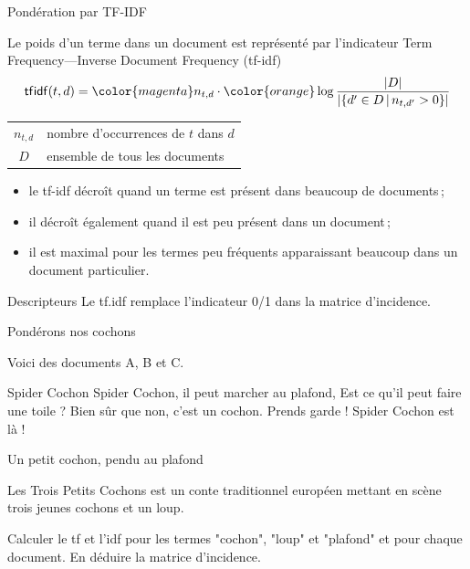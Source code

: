 \begin{frame}{Pondération par TF-IDF}

Le poids d'un terme dans un document est représenté par l'indicateur  \alert{Term Frequency---Inverse Document Frequency} (tf-idf)
 \[
\mathop{\mathsf{tf{}idf}}(t,d)={\color{magenta}n_{t,d}}\cdot
\color{orange}\log\frac{|D|}{\left|\left\{d'\in D\,|\,n_{t,d'}>0\right\}\right|}\]
\begin{center}\begin{tabular}{cl}
$n_{t,d}$& nombre d'occurrences de $t$ dans $d$\\
$D$& ensemble de tous les documents
\end{tabular}
\end{center}

\begin{itemize}
  \item le tf-idf décroît quand un terme est présent dans beaucoup de documents\,;
  \item il décroît également quand il est peu présent dans un document\,;
  \item il est maximal pour les termes peu fréquents apparaissant beaucoup dans un document particulier.
\end{itemize}

\begin{block}{Descripteurs}
Le tf.idf remplace l'indicateur 0/1 dans la matrice d'incidence.
\end{block}
\end{frame}


\begin{frame}[fragile]{Pondérons nos cochons}

Voici des documents A, B et C.

\begin{smallverbatim}
Spider Cochon Spider Cochon, il peut marcher au plafond, 
Est ce qu'il peut faire une toile ? Bien sûr que non, 
c'est un cochon. Prends garde ! Spider Cochon est là !
\end{smallverbatim}

\begin{smallverbatim}
Un petit cochon, pendu au plafond
\end{smallverbatim}

\begin{smallverbatim}
Les Trois Petits Cochons est un conte traditionnel européen 
mettant en scène trois jeunes cochons et un loup.
\end{smallverbatim}

\begin{exoblock}
Calculer le tf et l'idf pour les termes "cochon", "loup" et "plafond" 
et pour chaque document. En déduire la matrice d'incidence.
\end{exoblock}

\end{frame}


